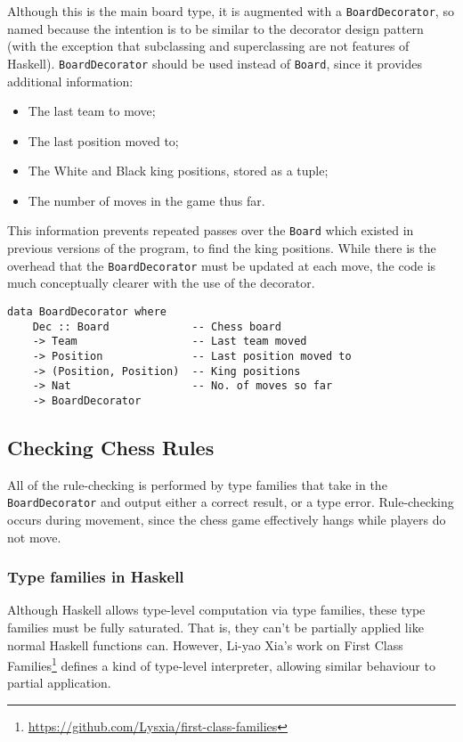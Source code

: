 \documentclass[12pt, a4paper]{scrartcl}
\begin{document}
Although this is the main board type, it is augmented with a \lstinline{BoardDecorator}, so named because the intention is to be similar to the decorator design pattern\cite{decorator} (with the exception that subclassing and superclassing are not features of Haskell). \lstinline{BoardDecorator} should be used instead of \lstinline{Board}, since it provides additional information:

\begin{itemize}
    \item The last team to move;
    \item The last position moved to;
    \item The White and Black king positions, stored as a tuple;
    \item The number of moves in the game thus far.
\end{itemize}

This information prevents repeated passes over the \lstinline{Board} which existed in previous versions of the program, to find the king positions. While there is the overhead that the \lstinline{BoardDecorator} must be updated at each move, the code is much conceptually clearer with the use of the decorator.

\begin{lstlisting}
data BoardDecorator where
    Dec :: Board             -- Chess board
    -> Team                  -- Last team moved
    -> Position              -- Last position moved to
    -> (Position, Position)  -- King positions
    -> Nat                   -- No. of moves so far
    -> BoardDecorator
\end{lstlisting}

\subsection{Checking Chess Rules}

All of the rule-checking is performed by type families that take in the \lstinline{BoardDecorator} and output either a correct result, or a type error. Rule-checking occurs during movement, since the chess game effectively hangs while players do not move.

\subsubsection{Type families in Haskell}

Although Haskell allows type-level computation via type families, these type families must be fully saturated. That is, they can't be partially applied like normal Haskell functions can. However, Li-yao Xia's work on First Class Families\footnote{\url{https://github.com/Lysxia/first-class-families}} defines a kind of type-level interpreter, allowing similar behaviour to partial application.
\end{document}

